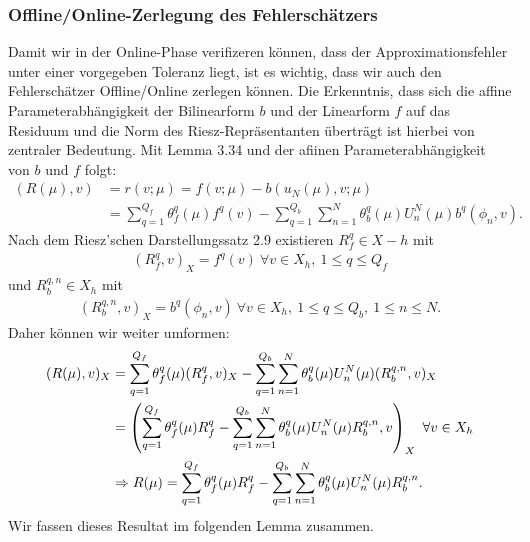 \subsubsection{Offline/Online-Zerlegung des Fehlerschätzers}
Damit wir in der Online-Phase verifizeren können, dass der Approximationsfehler unter einer vorgegeben Toleranz liegt, ist es wichtig, dass wir auch den Fehlerschätzer Offline/Online zerlegen können.
Die Erkenntnis, dass sich die affine Parameterabhängigkeit der Bilinearform $b$ und der Linearform $f$ auf das Residuum und die Norm des Riesz-Repräsentanten überträgt ist hierbei von zentraler Bedeutung.
Mit Lemma 3.34 und der afiinen Parameterabhängigkeit von $b$ und $f$ folgt:
\begin{align*}
(R(\mu),v) &= r(v;\mu) = f(v;\mu) - b(u_N(\mu),v;\mu)\\
&= \sum_{q=1}^{Q_f} \theta_f^q(\mu)f^q(v)- \sum_{q=1}^{Q_b}\sum_{n=1}^{N} \theta_b^q(\mu)U_n^N(\mu)b^q(\phi_n,v).
\end{align*}
Nach dem Riesz'schen Darstellungssatz 2.9 existieren $R_f^q\in X-h$ mit 
\begin{align}
(R_f^q,v)_X = f^q(v) ~\forall v\in X_h,~1\le q\le Q_f
\end{align}
und $R_b^{q,n}\in X_h$ mit
\begin{align}
(R_b^{q,n},v)_X = b^q(\phi_n,v) ~\forall v\in X_h,~1\le q\le Q_b,~1\le n\le N.
\end{align}
Daher können wir weiter umformen:
\begin{align*}
(R(\mu),v)_X &= \sum_{q=1}^{Q_f} \theta_f^q(\mu)(R_f^q,v)_X - \sum_{q=1}^{Q_b}\sum_{n=1}^{N} \theta_b^q(\mu)U_n^N(\mu)(R_b^{q,n},v)_X\\
&= \left( \sum_{q=1}^{Q_f} \theta_f^q(\mu)R_f^q - \sum_{q=1}^{Q_b}\sum_{n=1}^{N} \theta_b^q(\mu)U_n^N(\mu)R_b^{q,n},v\right)_X ~\forall v\in X_h\\
&\Rightarrow R(\mu) =  \sum_{q=1}^{Q_f} \theta_f^q(\mu)R_f^q - \sum_{q=1}^{Q_b}\sum_{n=1}^{N} \theta_b^q(\mu)U_n^N(\mu) R_b^{q,n}.
\end{align*}
Wir fassen dieses Resultat im folgenden Lemma zusammen.

